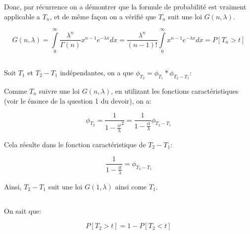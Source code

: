 \documentclass[a4paper]{article}
\begin{document}
Donc, par récurrence  on a démontrer que la formule  de probabilité est vraiment
applicable a $T_n$, et de même façon on a vérifié que $T_n$ suit une loi $G(n,\lambda)$.

\begin{equation}
G(n,\lambda)= \int\limits_0^\infty \frac{\lambda^{n}}{\Gamma (n)}x^{n-1}e^{-\lambda x}dx=\frac{\lambda^{n}}{(n-1)!}\int\limits_0^\infty x^{n-1}e^{-\lambda x}dx=P[T_n > t]
\end{equation}


\subsection{}
Soit $T_1$ et $T_2-T_1$ indépendantes, on a que $\phi_{T_2}=\phi_{T_1}*\phi_{T_2-T_1}$:

Comme  $T_n$   suivre  une  loi  $G(n,\lambda)$,  en   utilizant  les  fonctions
caractéristiques (voir le énonce de la question 1 du devoir), on a:

\begin{equation}
\phi_{T_2}=\frac{1}{1-\frac{it}{\lambda}^2}=\frac{1}{1-\frac{it}{\lambda}}\phi_{T_2-T_1}
\end{equation}

Cela résulte dans le fonction caractéristique de $T_2-T_1$:

\begin{equation}
\frac{1}{1-\frac{it}{\lambda}}=\phi_{T_2-T_1}
\end{equation}

Ainsi, $T_2-T_1$ suit une loi $G(1,\lambda)$ ainsi come $T_1$.





\subsection{}

On sait que:

\begin{equation}
P[T_2 > t] =1 - P[T_2 < t]
\end{equation}
\end{document}
